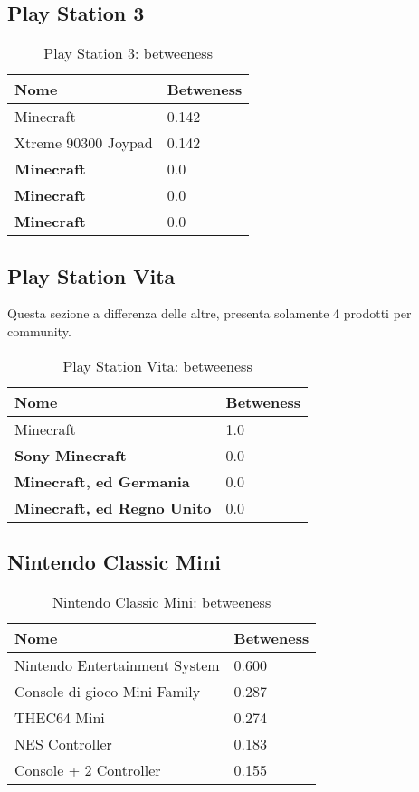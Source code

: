 		\subsection{Play Station 3}
			\begin{table}[H]
				\caption{Play Station 3: betweeness}
				\label{tab:ps3}
				\centering
				\begin{tabular}{ll}
					\toprule 
					\textbf{Nome} & \textbf{Betweness} \\
					\midrule
					Minecraft & 0.142 \\
					Xtreme 90300 Joypad & 0.142 \\
					\textbf{Minecraft}  & 0.0 \\
					\textbf{Minecraft} & 0.0 \\
					\textbf{Minecraft} & 0.0 \\		
					\bottomrule
				\end{tabular}
			\end{table}
		
	\pagebreak
	
		\subsection{Play Station Vita}
			Questa sezione a differenza delle altre, presenta solamente 4 prodotti per community.
			\begin{table}[H]
				\caption{Play Station Vita: betweeness}
				\label{tab:psvita}
				\centering
				\begin{tabular}{ll}
					\toprule 
					\textbf{Nome} & \textbf{Betweness} \\
					\midrule
					Minecraft & 1.0 \\
					\textbf{Sony Minecraft} & 0.0 \\
					\textbf{Minecraft, ed Germania} & 0.0 \\
					\textbf{Minecraft, ed Regno Unito} & 0.0 \\
					\bottomrule
				\end{tabular}
			\end{table}
		
		\subsection{Nintendo Classic Mini}
			\begin{table}[H]
				\caption{Nintendo Classic Mini: betweeness}
				\label{tab:nintendoclassicmini}
				\centering
				\begin{tabular}{ll}
					\toprule 
					\textbf{Nome} & \textbf{Betweness} \\
					\midrule
					Nintendo Entertainment System & 0.600\\
					Console di gioco Mini Family & 0.287 \\
					THEC64 Mini & 0.274 \\
					NES Controller & 0.183 \\
				    Console + 2 Controller & 0.155 \\		
					\bottomrule
				\end{tabular}
			\end{table}
				

